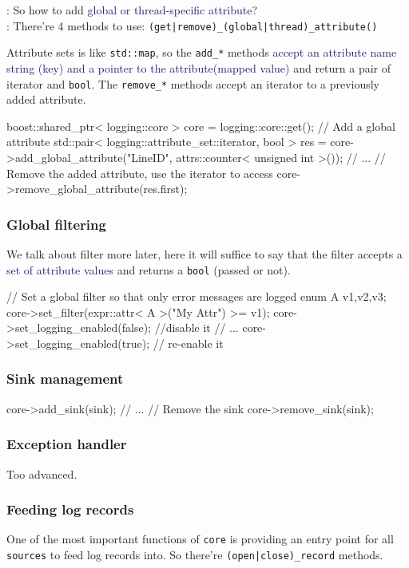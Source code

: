 \documentclass[dvipsnames]{article}
\newcommand{\mycola}{MidnightBlue}
\newcommand{\mycolb}{Mahogany}
\newcommand{\cola}[1]{\textcolor{\mycola}{#1}}
\newcommand{\colb}[1]{\textcolor{\mycolb}{#1}}
\begin{document}
\begin{tcolorbox}
   : So how to add \cola{global or thread-specific attribute}?\\
   : There're 4 methods to use: \verb!(get|remove)_(global|thread)_attribute()!
\end{tcolorbox}
Attribute sets is like \texttt{std::map}, so the \verb|add_*| methods
\cola{accept an attribute name string (key) and a pointer to the
  attribute(mapped value)} and return \colb{a pair of iterator and
  \texttt{bool}}. The \verb|remove_*| methods accept an iterator to a previously
added attribute.
\begin{simplec}
  boost::shared_ptr< logging::core > core = logging::core::get();
  // Add a global attribute
  std::pair< logging::attribute_set::iterator, bool > res =
  core->add_global_attribute("LineID", attrs::counter< unsigned int >());
  // ...
  // Remove the added attribute, use the iterator to access
  core->remove_global_attribute(res.first);
\end{simplec}

\subsubsection{Global filtering}
We talk about filter more later, here it will suffice to say that the filter
accepts \cola{a set of attribute values} and returns a \texttt{bool} (passed or
not). 
\begin{simplec}
  // Set a global filter so that only error messages are logged
  enum A {v1,v2,v3};
  core->set_filter(expr::attr< A >("My Attr") >= v1);
  core->set_logging_enabled(false); //disable it
  // ...
  core->set_logging_enabled(true); // re-enable it
\end{simplec}

\subsubsection{Sink management}
\begin{simplec}
  core->add_sink(sink);
  // ...
  // Remove the sink
  core->remove_sink(sink);
\end{simplec}

\subsubsection{Exception handler}
Too advanced.

\subsubsection{Feeding log records}
One of the most important functions of \texttt{core} is providing an entry point
for all \texttt{sources} to feed log records into. So there're
\verb-(open|close)_record- methods.
\end{document}
